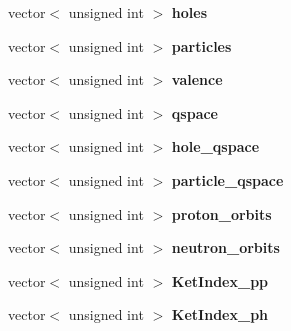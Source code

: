 \begin{DoxyCompactItemize}
\item 
\hypertarget{classModelSpace_a1889eb679e73b33fb95bcbd776379073}{vector$<$ unsigned int $>$ {\bfseries holes}}\label{classModelSpace_a1889eb679e73b33fb95bcbd776379073}

\item 
\hypertarget{classModelSpace_a58c42bd72028809326b800ac6ed23c87}{vector$<$ unsigned int $>$ {\bfseries particles}}\label{classModelSpace_a58c42bd72028809326b800ac6ed23c87}

\item 
\hypertarget{classModelSpace_a1415697ae6703a9c555252fae4c06760}{vector$<$ unsigned int $>$ {\bfseries valence}}\label{classModelSpace_a1415697ae6703a9c555252fae4c06760}

\item 
\hypertarget{classModelSpace_a5f4ca826af069ca08d47548a2455b7ee}{vector$<$ unsigned int $>$ {\bfseries qspace}}\label{classModelSpace_a5f4ca826af069ca08d47548a2455b7ee}

\item 
\hypertarget{classModelSpace_afb219f02b68b954e3ed04901010a1a70}{vector$<$ unsigned int $>$ {\bfseries hole\-\_\-qspace}}\label{classModelSpace_afb219f02b68b954e3ed04901010a1a70}

\item 
\hypertarget{classModelSpace_a6420ee68da314fc75bfe4aba89c1ea3d}{vector$<$ unsigned int $>$ {\bfseries particle\-\_\-qspace}}\label{classModelSpace_a6420ee68da314fc75bfe4aba89c1ea3d}

\item 
\hypertarget{classModelSpace_a0027efd87e9973ca9d4a063f3682c1ca}{vector$<$ unsigned int $>$ {\bfseries proton\-\_\-orbits}}\label{classModelSpace_a0027efd87e9973ca9d4a063f3682c1ca}

\item 
\hypertarget{classModelSpace_aa6d9e055e40592de4fbbc87f6e1d6672}{vector$<$ unsigned int $>$ {\bfseries neutron\-\_\-orbits}}\label{classModelSpace_aa6d9e055e40592de4fbbc87f6e1d6672}

\item 
\hypertarget{classModelSpace_ad00f41bdc579c054c01f7e39100bcae7}{vector$<$ unsigned int $>$ {\bfseries Ket\-Index\-\_\-pp}}\label{classModelSpace_ad00f41bdc579c054c01f7e39100bcae7}

\item 
\hypertarget{classModelSpace_a8517967ef07d888cb6ff270b51673e81}{vector$<$ unsigned int $>$ {\bfseries Ket\-Index\-\_\-ph}}\label{classModelSpace_a8517967ef07d888cb6ff270b51673e81}


\end{DoxyCompactItemize}
